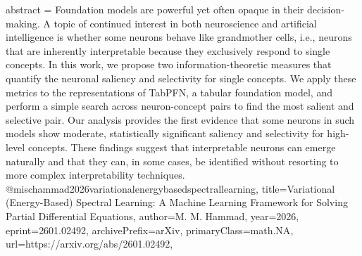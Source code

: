 {      abstract = {Foundation models are powerful yet often opaque in their decision-making. A topic of continued interest in both neuroscience and artificial intelligence is whether some neurons behave like grandmother cells, i.e., neurons that are inherently interpretable because they exclusively respond to single concepts. In this work, we propose two information-theoretic measures that quantify the neuronal saliency and selectivity for single concepts. We apply these metrics to the representations of TabPFN, a tabular foundation model, and perform a simple search across neuron-concept pairs to find the most salient and selective pair. Our analysis provides the first evidence that some neurons in such models show moderate, statistically significant saliency and selectivity for high-level concepts. These findings suggest that interpretable neurons can emerge naturally and that they can, in some cases, be identified without resorting to more complex interpretability techniques.}
}@misc{hammad2026variationalenergybasedspectrallearning,
      title={Variational (Energy-Based) Spectral Learning: A Machine Learning Framework for Solving Partial Differential Equations}, 
      author={M. M. Hammad},
      year={2026},
      eprint={2601.02492},
      archivePrefix={arXiv},
      primaryClass={math.NA},
      url={https://arxiv.org/abs/2601.02492},
}
